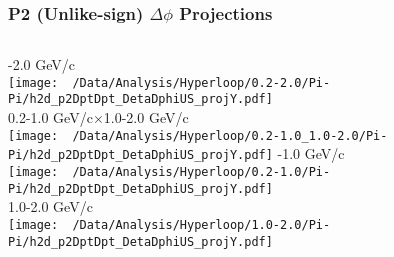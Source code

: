 \documentclass{beamer}
\begin{document}
\begin{frame}
	\frametitle{P2 (Unlike-sign) $\Delta\phi$ Projections}
	\begin{columns}
		-2.0 GeV/c\\
		\texttt{[image: ~/Data/Analysis/Hyperloop/0.2-2.0/Pi-Pi/h2d\_p2DptDpt\_DetaDphiUS\_projY.pdf]}\\0.2-1.0 GeV/c$\times$1.0-2.0 GeV/c\\
		\texttt{[image: ~/Data/Analysis/Hyperloop/0.2-1.0\_1.0-2.0/Pi-Pi/h2d\_p2DptDpt\_DetaDphiUS\_projY.pdf]}
		-1.0 GeV/c\\
		\texttt{[image: ~/Data/Analysis/Hyperloop/0.2-1.0/Pi-Pi/h2d\_p2DptDpt\_DetaDphiUS\_projY.pdf]}\\1.0-2.0 GeV/c\\
		\texttt{[image: ~/Data/Analysis/Hyperloop/1.0-2.0/Pi-Pi/h2d\_p2DptDpt\_DetaDphiUS\_projY.pdf]}
	\end{columns}
\end{frame}
\end{document}
